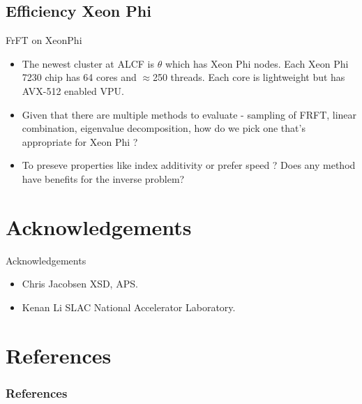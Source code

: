 \documentclass{beamer}
\begin{document}
\subsection{Efficiency Xeon Phi}
\begin{frame}{FrFT on XeonPhi}
\begin{itemize}
	\item The newest cluster at ALCF is $\theta$ which has Xeon Phi nodes. Each Xeon Phi 7230 chip has 64 cores and $\approx$250 threads. Each core is lightweight but has AVX-512 enabled VPU. 
	\item Given that there are multiple methods to evaluate - sampling of FRFT, linear combination, eigenvalue decomposition, how do we pick one that's appropriate for Xeon Phi ? 
	\item To preseve properties like index additivity or prefer speed ? Does any method have benefits for the inverse problem? 
\end{itemize}
\end{frame}




\section*{Acknowledgements}

\begin{frame}{Acknowledgements}
  \begin{itemize}
  \item
    \alert{Chris Jacobsen} XSD, APS.
  \item
  	\alert{Kenan Li} SLAC National Accelerator Laboratory.
  \end{itemize}
\end{frame}


\renewcommand*{\bibfont}{\small}
\section{References}
\begin{frame}[t, allowframebreaks]
\frametitle{References}


\end{frame}
\end{document}
